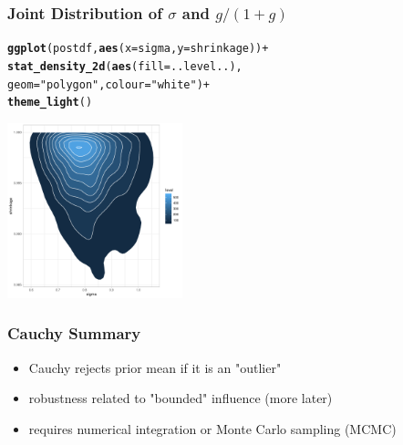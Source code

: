 \documentclass[]{beamer}\usepackage[]{graphicx}\usepackage[]{color}
\makeatletter
\newcommand{\hlstr}[1]{\textcolor[rgb]{0.192,0.494,0.8}{#1}}%
\newcommand{\hlopt}[1]{\textcolor[rgb]{0,0,0}{#1}}%
\newcommand{\hlstd}[1]{\textcolor[rgb]{0.345,0.345,0.345}{#1}}%
\newcommand{\hlkwc}[1]{\textcolor[rgb]{0.333,0.667,0.333}{#1}}%
\newcommand{\hlkwd}[1]{\textcolor[rgb]{0.737,0.353,0.396}{\textbf{#1}}}%
\newenvironment{kframe}{%
 \def\at@end@of@kframe{}%
 \ifinner\ifhmode%
  \def\at@end@of@kframe{\end{minipage}}%
  \begin{minipage}{\columnwidth}%
 \fi\fi%
 \def\FrameCommand##1{\hskip\@totalleftmargin \hskip-\fboxsep
 \colorbox{shadecolor}{##1}\hskip-\fboxsep
     \hskip-\linewidth \hskip-\@totalleftmargin \hskip\columnwidth}%
 \MakeFramed {\advance\hsize-\width
   \@totalleftmargin\z@ \linewidth\hsize
   \@setminipage}}%
 {\par\unskip\endMakeFramed%
 \at@end@of@kframe}
\newenvironment{knitrout}{}{} %
\makeatother
\begin{document}
\begin{frame}[fragile] \frametitle{Joint Distribution of $\sigma$ and $g/(1 + g)$}

\begin{knitrout}
\color{fgcolor}\begin{kframe}
\begin{alltt}
\hlkwd{ggplot}\hlstd{(postdf,} \hlkwd{aes}\hlstd{(}\hlkwc{x}\hlstd{=sigma,} \hlkwc{y}\hlstd{=shrinkage) )} \hlopt{+}
 \hlkwd{stat_density_2d}\hlstd{(}\hlkwd{aes}\hlstd{(}\hlkwc{fill} \hlstd{= ..level..),}
                 \hlkwc{geom} \hlstd{=} \hlstr{"polygon"}\hlstd{,} \hlkwc{colour}\hlstd{=}\hlstr{"white"}\hlstd{)} \hlopt{+}
  \hlkwd{theme_light}\hlstd{()}
\end{alltt}
\end{kframe}
\includegraphics[width=2in,height=2in]{figure/unnamed-chunk-5-1} 

\end{knitrout}


\end{frame}

\begin{frame}\frametitle{Cauchy Summary}
\begin{itemize}
\item Cauchy rejects prior mean if it is an "outlier"
\item robustness related to "bounded" influence (more later)
\item requires numerical integration or Monte Carlo sampling (MCMC)
\end{itemize}
\end{frame}
\end{document}
